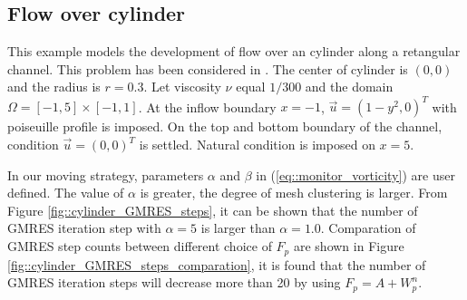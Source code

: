 \documentclass{eajam}
\begin{document}


   \subsection{Flow over cylinder}
   
      This example models the development of flow over an cylinder
      along a retangular channel. This problem has been considered in
      \cite{cao1999anr}. The center of cylinder is $(0, 0)$ and the
      radius is $r = 0.3$. Let viscosity $\nu$  equal  $1 / 300$ and
      the domain $\Omega = [-1, 5] \times [-1, 1]$. At the inflow
      boundary $x = -1$, $\vec{u} = (1 - y^2, 0)^T$ with poiseuille
      profile is imposed. On the top and bottom boundary of the
      channel, condition $\vec{u} = (0, 0)^T$ is settled. Natural
      condition is imposed on $x = 5$. 
      
      In our moving strategy, parameters $\alpha$ and
      $\beta$ in (\ref{eq::monitor_vorticity}) are user defined. The
      value of $\alpha$ is greater, the degree of mesh clustering is
      larger. From Figure \ref{fig::cylinder_GMRES_steps}, it can be
      shown that the number of GMRES iteration step with $\alpha = 5$
      is larger than $\alpha = 1.0$. Comparation of GMRES step counts
      between different choice of $F_p$ are shown in Figure 
      \ref{fig::cylinder_GMRES_steps_comparation}, it is found that
      the number of GMRES iteration steps will decrease more than 20 by  
      using $F_p = A + W_p^n$.
\end{document}

